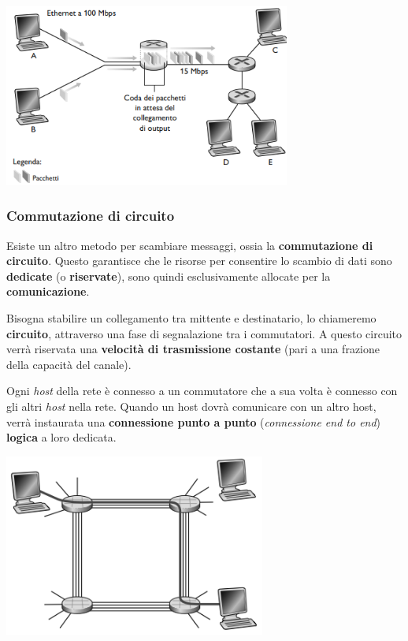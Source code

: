 \includegraphics[width=\textwidth, height=6cm, keepaspectratio]{img/commutazione_di_pacchetto.png}

\subsubsection{Commutazione di circuito}
Esiste un altro metodo per scambiare messaggi, ossia la \textbf{commutazione di circuito}. Questo garantisce che le risorse per consentire lo scambio di dati sono \textbf{dedicate} (o \textbf{riservate}), sono quindi esclusivamente allocate per la \textbf{comunicazione}.

Bisogna stabilire un collegamento tra mittente e destinatario, lo chiameremo \textbf{circuito}, attraverso una fase di segnalazione tra i commutatori. A questo circuito verrà riservata una \textbf{velocità di trasmissione costante} (pari a una frazione della capacità del canale).

Ogni \textit{host} della rete è connesso a un commutatore che a sua volta è connesso con gli altri \textit{host} nella rete. Quando un host dovrà comunicare con un altro host, verrà instaurata una \textbf{connessione punto a punto} (\textit{connessione end to end}) \textbf{logica} a loro dedicata.

\includegraphics[width=\textwidth, height=6cm, keepaspectratio]{img/commutazione_di_circuito.png}

